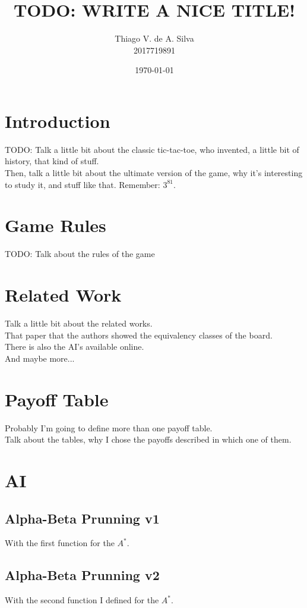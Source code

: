 \documentclass[10pt]{article}
\title{\textbf{TODO: WRITE A NICE TITLE!}}
\author{Thiago V. de A. Silva\\2017719891}
\date{\today}
\begin{document}
\maketitle

\section{Introduction}

TODO: Talk a little bit about the classic tic-tac-toe, who invented, a little bit of history, that kind of stuff.\\

Then, talk a little bit about the ultimate version of the game, why it's interesting to study it, and stuff like that.
Remember: $3^81$.

\section{Game Rules}
TODO: Talk about the rules of the game



\section{Related Work}
Talk a little bit about the related works.\\
That paper that the authors showed the equivalency classes of the board.\\
There is also the AI's available online.\\
And maybe more...



\section{Payoff Table}
Probably I'm going to define more than one payoff table.\\
Talk about the tables, why I chose the payoffs described in which one of them.



\section{AI}
\subsection{Alpha-Beta Prunning v1}
With the first function for the $A^*$.

\subsection{Alpha-Beta Prunning v2}
With the second function I defined for the $A^*$.
\end{document}
